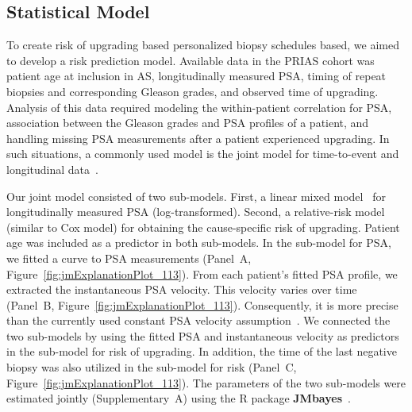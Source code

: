\subsection{Statistical Model}
To create risk of upgrading based personalized biopsy schedules based, we aimed to develop a risk prediction model. Available data in the PRIAS cohort was patient age at inclusion in AS, longitudinally measured PSA, timing of repeat biopsies and corresponding Gleason grades, and observed time of upgrading. Analysis of this data required modeling the within-patient correlation for PSA, association between the Gleason grades and PSA profiles of a patient, and handling missing PSA measurements after a patient experienced upgrading. In such situations, a commonly used model is the joint model for time-to-event and longitudinal data~\citep{tomer2019,coley2017prediction,rizopoulos2012joint}.

Our joint model consisted of two sub-models. First, a linear mixed model~\citep{laird1982random} for longitudinally measured PSA (log-transformed). Second, a relative-risk model (similar to Cox model) for obtaining the cause-specific risk of upgrading. Patient age was included as a predictor in both sub-models. In the sub-model for PSA, we fitted a curve to PSA measurements (Panel~A, Figure~\ref{fig:jmExplanationPlot_113}). From each patient's fitted PSA profile, we extracted the instantaneous PSA velocity. This velocity varies over time (Panel~B, Figure~\ref{fig:jmExplanationPlot_113}). Consequently, it is more precise than the currently used constant PSA velocity assumption~\citep{vickers2009psavelocity}. We connected the two sub-models by using the fitted PSA and instantaneous velocity as predictors in the sub-model for risk of upgrading. In addition, the time of the last negative biopsy was also utilized in the sub-model for risk (Panel~C, Figure~\ref{fig:jmExplanationPlot_113}). The parameters of the two sub-models were estimated jointly (Supplementary~A) using the R package \textbf{JMbayes}~\citep{rizopoulosJMbayes}. 


